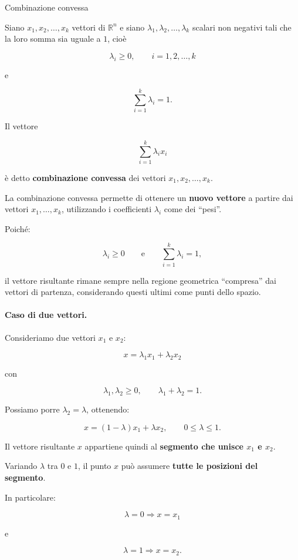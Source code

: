 \begin{definition}{Combinazione convessa}

Siano $x_1,x_2,\ldots,x_k$ vettori di $\mathbb{R}^n$ e siano
$\lambda_1,\lambda_2,\ldots,\lambda_k$ scalari non negativi tali che la loro somma sia uguale a $1$, cioè

$$
\lambda_i\geq0,\qquad i=1,2,\ldots,k
$$

e

$$
\sum_{i=1}^{k}\lambda_i=1.
$$

Il vettore

$$
\sum_{i=1}^{k}\lambda_i x_i
$$

è detto \textbf{combinazione convessa} dei vettori
$x_1,x_2,\ldots,x_k$.

La combinazione convessa permette di ottenere un \textbf{nuovo vettore} a partire dai vettori $x_1,\ldots,x_k$, utilizzando i coefficienti $\lambda_i$ come dei ``pesi''.

Poiché:

$$
\lambda_i\geq0
\qquad\text{e}\qquad
\sum_{i=1}^{k}\lambda_i=1,
$$

il vettore risultante rimane sempre nella regione geometrica ``compresa'' dai vettori di partenza, considerando questi ultimi come punti dello spazio.

\paragraph{Caso di due vettori.}

Consideriamo due vettori $x_1$ e $x_2$:

$$
x=\lambda_1x_1+\lambda_2x_2
$$

con

$$
\lambda_1,\lambda_2\geq0,
\qquad
\lambda_1+\lambda_2=1.
$$

Possiamo porre $\lambda_2=\lambda$, ottenendo:

$$
x=(1-\lambda)x_1+\lambda x_2,
\qquad
0\leq\lambda\leq1.
$$

Il vettore risultante $x$ appartiene quindi al \textbf{segmento che unisce $x_1$ e $x_2$}.

\begin{center}
\end{center}

Variando $\lambda$ tra $0$ e $1$, il punto $x$ può assumere \textbf{tutte le posizioni del segmento}.

In particolare:

$$
\lambda=0 \Rightarrow x=x_1
$$

e

$$
\lambda=1 \Rightarrow x=x_2.
$$


\end{definition}



